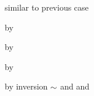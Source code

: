 \begin{lamportproof}
    \begin{pfproof}
      \qedstep
        \begin{pfproof}
          similar to previous case
        \end{pfproof}
    \end{pfproof}

    \begin{pfproof}
      \qedstep
        \begin{pfproof}
          by 
        \end{pfproof}
    \end{pfproof}

    \begin{pfproof}
      \qedstep
        \begin{pfproof}
          by 
        \end{pfproof}
    \end{pfproof}

    \begin{pfproof}
      \qedstep
        \begin{pfproof}
          by 
        \end{pfproof}
    \end{pfproof}

    \begin{pfproof}
      \qedstep
        \begin{pfproof}
          by inversion $\sim$ and  and 
        \end{pfproof}
    \end{pfproof}


\end{lamportproof}
